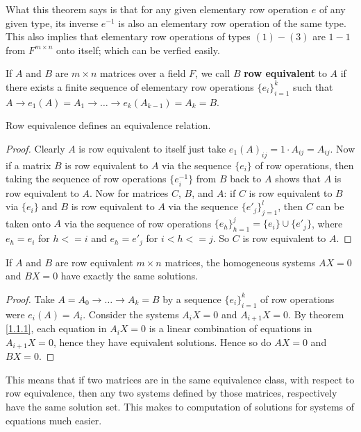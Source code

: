 \begin{remark}
     What this theorem says is that for any given elementary row operation $e$ of any given type,
     its inverse $e^{-1}$ is also an elementary row operation of the same type. This also implies
     that elementary row operations of types $(1)-(3)$ are $1-1$ from  $F^{m \times n}$ onto itself;
     which can be verfied easily.
\end{remark}

\begin{definition}
     If $A$ and  $B$ are  $m \times n$ matrices over a field $F$, we call  $B$  \textbf{row
     equivalent} to $A$ if there exists a finite sequence of elementary row operations
     $\{e_i\}_{i=1}^k$ such that $A \rightarrow e_1(A)=A_1 \rightarrow \dots \rightarrow
     e_k(A_{k-1})=A_k = B$.
\end{definition}

\begin{lemma}\label{1.2.2}
    Row equivalence defines an equivalence relation.
\end{lemma}
\begin{proof}
    Clearly $A$ is row equivalent to itself just take  $e_1(A)_{ij}=1 \cdot A_{ij}=A_{ij}$. Now if a
    matrix $B$ is row equivalent to  $A$ via the sequence  $\{e_i\}$ of row operations, then taking
    the sequence of row operations $\{e_i^{-1}\}$ from $B$ back to  $A$ shows that  $A$ is row
    equivalent to  $A$. Now for matrices $C$,  $B$, and  $A$: if  $C$ is row equivalent to  $B$  via
    $\{e_i\}$ and $B$ is row equivalent to  $A$ via the sequence  $\{e'_j\}_{j=1}^l$, then $C$ can
    be taken onto  $A$ via the sequence of row operations  $\{e_h\}_{h=1}^j=\{e_i\} \cup \{e'_j\}$,
    where $e_h=e_i$ for  $h <= i$ and $e_h=e'_j$ for  $i < h <= j$. So  $C$ is row equivalent to
    $A$.
\end{proof}

\begin{theorem}\label{1.2.3}
    If $A$ and  $B$ are row equivalent  $m \times n$ matrices, the homogeneous systems  $AX=0$ and
    $BX=0$ have exactly the same solutions.
\end{theorem}
\begin{proof}
    Take $A=A_0 \rightarrow \dots \rightarrow A_k=B$ by a sequence $\{e_i\}_{i=1}^k$ of row
    operations were $e_i(A)=A_i$. Consider the systems $A_iX=0$ and  $A_{i+1}X=0$. By theorem
    \ref{1.1.1}, each equation in $A_iX=0$ is a linear combination of equations in $A_{i+1}X=0$,
    hence they have equivalent solutions. Hence so do $AX=0$ and  $BX=0$.
\end{proof}
\begin{remark}
    This means that if two matrices are in the same equivalence class, with respect to row
    equivalence, then any two systems defined by those matrices, respectively have the same solution
    set. This makes to computation of solutions for systems of equations much easier.
\end{remark}


